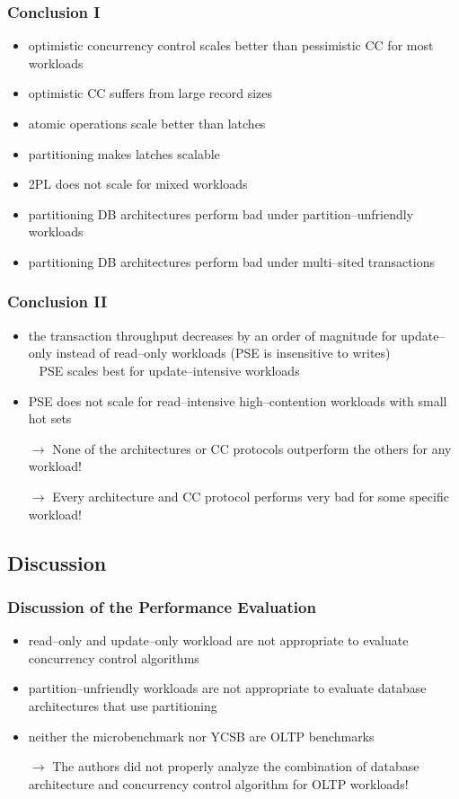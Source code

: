 \begin{frame}
	\frametitle{Conclusion I}

	\begin{itemize}
		\item	optimistic concurrency control scales better than pessimistic CC for most workloads
		\item	optimistic CC suffers from large record sizes
		\item	atomic operations scale better than latches
		\item	partitioning makes latches scalable
		\item	2PL does not scale for mixed workloads
		\item	partitioning DB architectures perform bad under partition--unfriendly workloads
		\item	partitioning DB architectures perform bad under multi--sited transactions
	\end{itemize}
\end{frame}

\begin{frame}
	\frametitle{Conclusion II}

	\begin{itemize}
		\item	the transaction throughput decreases by an order of magnitude for update--only instead of read--only workloads (PSE is insensitive to writes) \\ \bm{$\rightarrow$} PSE scales best for update--intensive workloads
		\item	PSE does not scale for read--intensive high--contention workloads with small hot sets
		\item[$\rightarrow$]	None of the architectures or CC protocols outperform the others for any workload!
		\item[$\rightarrow$]	Every architecture and CC protocol performs very bad for some specific workload!
	\end{itemize}
\end{frame}

\subsection[Discussion]{Discussion} \label{subsec:discussion}

\begin{frame}
	\frametitle{Discussion of the Performance Evaluation}

	\begin{itemize}
		\item	read--only and update--only workload are not appropriate to evaluate concurrency control algorithms
		\item	partition--unfriendly workloads are not appropriate to evaluate database architectures that use partitioning
		\item	neither the microbenchmark nor YCSB are OLTP benchmarks
		\item[$\rightarrow$]	The authors did not properly analyze the combination of database architecture and concurrency control algorithm for OLTP workloads!
	\end{itemize}
\end{frame}
